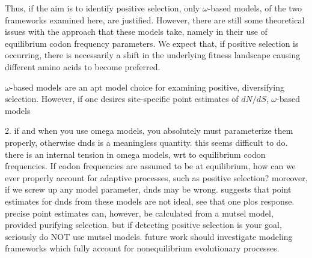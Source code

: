 \documentclass{pnastwo}
\begin{document}
\begin{article}
Thus, if the aim is to identify positive selection, only $\omega$-based models, of the two frameworks examined here, are justified. However, there are still some theoretical issues with the approach that these models take, namely in their use of equilibrium codon frequency parameters. We expect that, if positive selection is occurring, there is necessarily a shift in the underlying fitness landscape causing different amino acids to become preferred. 




$\omega$-based models are an apt model choice for examining positive, diversifying selection. However, if one desires site-specific point estimates of $dN/dS$, $\omega$-based models   

 
2. if and when you use omega models, you absolutely must parameterize them properly, otherwise dnds is a meaningless quantity. this seems difficult to do. there is an internal tension in omega models, wrt to equilibrium codon frequencies. If codon frequencies are assumed to be at equilibrium, how can we ever properly account for adaptive processes, such as positive selection? moreover, if we screw up any model parameter, dnds may be wrong. suggests that point estimates for dnds from these models are not ideal, see that one plos response. precise point estimates can, however, be calculated from a mutsel model, provided purifying selection. but if detecting positive selection is your goal, seriously do NOT use mutsel models. future work should investigate modeling frameworks which fully account for nonequilibrium evolutionary processes.


\end{article}
\end{document}
